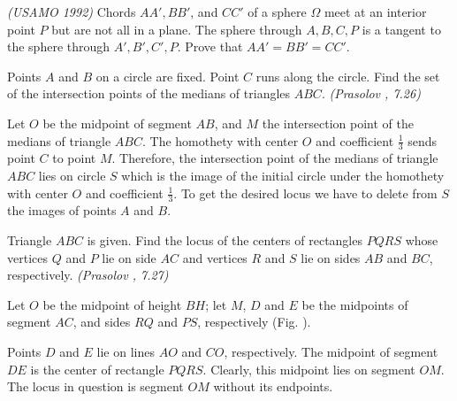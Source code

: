 \documentclass[11pt,twoside]{scrartcl}
\begin{document}
\begin{problem}
    \textit{(USAMO 1992)} Chords $AA', BB'$, and $CC'$ of a sphere $\Omega$ meet at an interior point $P$ but are not all in a plane. The sphere through $A, B, C, P$ is a tangent to the sphere through $A', B', C', P$. Prove that $AA' = BB' = CC'$.
    \begin{sketch}
        \TBD 
    \end{sketch}
\end{problem}

\begin{problem}
    Points $A$ and $B$ on a circle are fixed. Point $C$ runs along the circle. Find the set of the intersection points of the medians of triangles $ABC$. \textit{(Prasolov \cite{pgeo}, 7.26)}
    \begin{sketch}
        Let $O$ be the midpoint of segment $AB$, and $M$ the intersection point of the medians of triangle $ABC$. The homothety with center $O$ and coefficient $\frac{1}{3}$ sends point $C$ to point $M$.
        Therefore, the intersection point of the medians of triangle $ABC$ lies on circle $S$ which is
        the image of the initial circle under the homothety with center $O$ and coefficient $\frac{1}{3}$. To get the desired locus we have to delete from $S$ the images of points $A$ and $B$.
    \end{sketch}
\end{problem}

\begin{problem}
    Triangle $ABC$ is given. Find the locus of the centers of rectangles $PQRS$ whose
    vertices $Q$ and $P$ lie on side $AC$ and vertices $R$ and $S$ lie on sides $AB$ and $BC$, respectively. \textit{(Prasolov \cite{pgeo}, 7.27)}
    \begin{sketch}
    Let $O$ be the midpoint of height $BH$; let $M$, $D$ and $E$ be the midpoints of segment $AC$, and sides $RQ$ and $PS$, respectively (Fig. \TBD).

    Points $D$ and $E$ lie on lines $AO$ and $CO$, respectively. The midpoint of segment $DE$ is the center of rectangle $PQRS$. Clearly, this midpoint lies on segment $OM$. The locus in question is segment $OM$ without its endpoints.
\end{sketch}
\end{problem}
\end{document}
